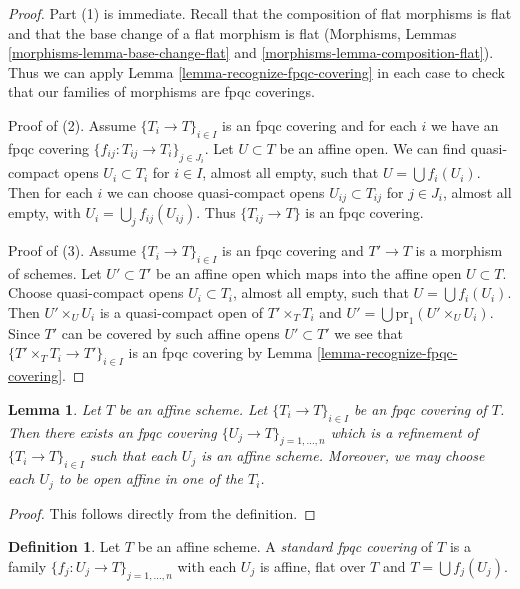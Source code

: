 \documentclass{stacks-project}
\theoremstyle{plain}
\newtheorem{lemma}[subsection]{Lemma}
\theoremstyle{definition}
\newtheorem{definition}[subsection]{Definition}
\theoremstyle{remark}
\numberwithin{equation}{subsection}
\begin{document}
\begin{proof}
Part (1) is immediate. Recall that the composition of flat morphisms
is flat and that the base change of a flat morphism is flat
(Morphisms, Lemmas \ref{morphisms-lemma-base-change-flat} and
\ref{morphisms-lemma-composition-flat}).
Thus we can apply Lemma \ref{lemma-recognize-fpqc-covering}
in each case to check that our families of morphisms are fpqc coverings.

\medskip\noindent
Proof of (2). Assume $\{T_i \to T\}_{i\in I}$ is an fpqc covering and for each
$i$ we have an fpqc covering $\{f_{ij} : T_{ij} \to T_i\}_{j\in J_i}$.
Let $U \subset T$ be an affine open. We can find
quasi-compact opens $U_i \subset T_i$ for $i \in I$, almost all empty,
such that $U = \bigcup f_i(U_i)$. Then for each $i$ we can choose
quasi-compact opens $U_{ij} \subset T_{ij}$ for $j \in J_i$, almost all empty,
with $U_i = \bigcup_j f_{ij}(U_{ij})$. Thus
$\{T_{ij} \to T\}$ is an fpqc covering.

\medskip\noindent
Proof of (3). Assume $\{T_i \to T\}_{i\in I}$ is an fpqc covering
and $T' \to T$ is a morphism of schemes. Let $U' \subset T'$ be an affine
open which maps into the affine open $U \subset T$. Choose
quasi-compact opens $U_i \subset T_i$, almost all empty,
such that $U = \bigcup f_i(U_i)$. Then $U' \times_U U_i$ is
a quasi-compact open of $T' \times_T T_i$ and
$U' = \bigcup \text{pr}_1(U' \times_U U_i)$. Since $T'$
can be covered by such affine opens $U' \subset T'$ we see
that $\{T' \times_T T_i \to T'\}_{i\in I}$ is an fpqc covering by
Lemma \ref{lemma-recognize-fpqc-covering}.
\end{proof}

\begin{lemma}
\label{lemma-fpqc-affine}
Let $T$ be an affine scheme.
Let $\{T_i \to T\}_{i \in I}$ be an fpqc covering of $T$.
Then there exists an fpqc covering
$\{U_j \to T\}_{j = 1, \ldots, n}$ which is a refinement
of $\{T_i \to T\}_{i \in I}$ such that each $U_j$ is an affine
scheme. Moreover, we may choose each $U_j$ to be open affine
in one of the $T_i$.
\end{lemma}

\begin{proof}
This follows directly from the definition.
\end{proof}

\begin{definition}
\label{definition-standard-fpqc}
Let $T$ be an affine scheme. A {\it standard fpqc covering}
of $T$ is a family $\{f_j : U_j \to T\}_{j = 1, \ldots, n}$
with each $U_j$ is affine, flat over $T$ and $T = \bigcup f_j(U_j)$.
\end{definition}
\end{document}
